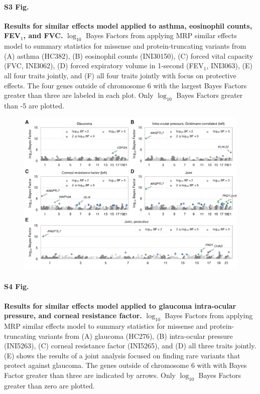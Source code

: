 \paragraph*{S3 Fig.}
\label{asthma_similar}
{\bf Results for similar effects model applied to asthma, eosinophil counts, FEV$_1$, and FVC.} $\log_{10}$ Bayes Factors from applying MRP similar effects model to summary statistics for missense and protein-truncating variants from (A) asthma (HC382), (B) eosinophil counts (INI30150), (C) forced vital capacity (FVC, INI3062), (D) forced expiratory volume in 1-second (FEV$_1$, INI3063), (E) all four traits jointly, and (F) all four traits jointly with focus on protective effects. The four genes outside of chromosome 6 with the largest Bayes Factors greater than three are labeled in each plot. Only $\log_{10}$ Bayes Factors greater than -5 are plotted.

\begin{figure}[H]
\includegraphics[width=\textwidth]{../figures/Figure_S04.pdf}
\end{figure}
\paragraph*{S4 Fig.}
\label{glaucoma_similar}
{\bf Results for similar effects model applied to glaucoma intra-ocular pressure, and corneal resistance factor.} $\log_{10}$ Bayes Factors from applying MRP similar effects model to summary statistics for missense and protein-truncating variants from (A) glaucoma (HC276), (B) intra-ocular pressure (INI5263), (C) corneal resistance factor (INI5265), and (D) all three traits jointly. (E) shows the results of a joint analysis focused on finding rare variants that protect against glaucoma. The genes outside of chromosome 6 with with Bayes Factor greater than three are indicated by arrows. Only $\log_{10}$ Bayes Factors greater than zero are plotted.

